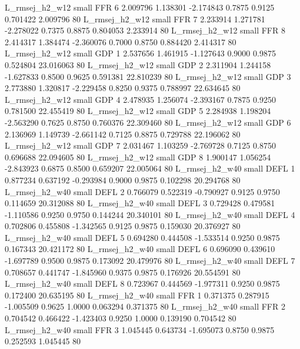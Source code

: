 L_rmsej_h2_w12      small      FFR                 6 2.009796 1.138301 -2.174843 0.7875 0.9125  0.701422    2.009796 80
L_rmsej_h2_w12      small      FFR                 7 2.233914 1.271781 -2.278022 0.7375 0.8875  0.804053    2.233914 80
L_rmsej_h2_w12      small      FFR                 8 2.414317 1.384474 -2.360076 0.7000 0.8750  0.884420    2.414317 80
L_rmsej_h2_w12      small      GDP                 1 2.537656 1.461915 -1.127643 0.9000 0.9875  0.524804   23.016063 80
L_rmsej_h2_w12      small      GDP                 2 2.311904 1.244158 -1.627833 0.8500 0.9625  0.591381   22.810239 80
L_rmsej_h2_w12      small      GDP                 3 2.773880 1.320817 -2.229458 0.8250 0.9375  0.788997   22.634645 80
L_rmsej_h2_w12      small      GDP                 4 2.478935 1.256074 -2.393167 0.7875 0.9250  0.781500   22.455419 80
L_rmsej_h2_w12      small      GDP                 5 2.284938 1.198204 -2.563290 0.7625 0.8750  0.760376   22.309460 80
L_rmsej_h2_w12      small      GDP                 6 2.136969 1.149739 -2.661142 0.7125 0.8875  0.729788   22.196062 80
L_rmsej_h2_w12      small      GDP                 7 2.031467 1.103259 -2.769728 0.7125 0.8750  0.696688   22.094605 80
L_rmsej_h2_w12      small      GDP                 8 1.900147 1.056254 -2.843923 0.6875 0.8500  0.659207   22.005064 80
L_rmsej_h2_w40      small     DEFL                 1 0.877234 0.637192 -0.293984 0.9000 0.9875  0.102298   20.294768 80
L_rmsej_h2_w40      small     DEFL                 2 0.766079 0.522319 -0.790927 0.9125 0.9750  0.114659   20.312088 80
L_rmsej_h2_w40      small     DEFL                 3 0.729428 0.479581 -1.110586 0.9250 0.9750  0.144244   20.340101 80
L_rmsej_h2_w40      small     DEFL                 4 0.702806 0.455808 -1.342565 0.9125 0.9875  0.159030   20.376927 80
L_rmsej_h2_w40      small     DEFL                 5 0.694280 0.444508 -1.533514 0.9250 0.9875  0.167343   20.421172 80
L_rmsej_h2_w40      small     DEFL                 6 0.696090 0.439610 -1.697789 0.9500 0.9875  0.173092   20.479976 80
L_rmsej_h2_w40      small     DEFL                 7 0.708657 0.441747 -1.845960 0.9375 0.9875  0.176926   20.554591 80
L_rmsej_h2_w40      small     DEFL                 8 0.723967 0.444569 -1.977311 0.9250 0.9875  0.172400   20.635195 80
L_rmsej_h2_w40      small      FFR                 1 0.371375 0.287915 -1.005509 0.9625 1.0000  0.063294    0.371375 80
L_rmsej_h2_w40      small      FFR                 2 0.704542 0.466422 -1.423403 0.9250 1.0000  0.139190    0.704542 80
L_rmsej_h2_w40      small      FFR                 3 1.045445 0.643734 -1.695073 0.8750 0.9875  0.252593    1.045445 80
